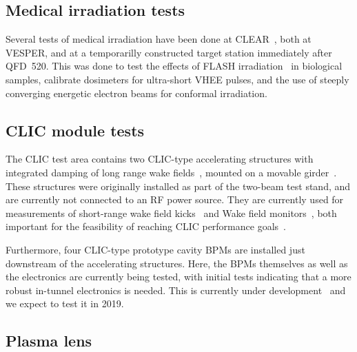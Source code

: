 \documentclass[a4paper,
               keeplastbox,   %
               ]{jacow}
\begin{document}
\subsection{Medical irradiation tests}
Several tests of medical irradiation have been done at CLEAR~\cite{Wilfrid::CLEARrev}, both at VESPER, and at a temporarilly constructed target station immediately after QFD~520.
This was done to test the effects of FLASH irradiation~\cite{FLASH2017} in biological samples, calibrate dosimeters for ultra-short VHEE pulses, and the use of steeply converging energetic electron beams for conformal irradiation.

\subsection{CLIC module tests}
The CLIC test area contains two CLIC-type accelerating structures with integrated damping of long range wake fields~\cite{Grudiev:TD26}, mounted on a movable girder~\cite{Durand-mover::AccelAlign12,Sosin-mover::IPAC12}.
These structures were originally installed as part of the two-beam test stand, and are currently not connected to an RF power source.
They are currently used for measurements of short-range wake field kicks~\cite{Antonio::IEEE-Kicks} and Wake field monitors~\cite{KyrreSjobak::CLICWS19}, both important for the feasibility of reaching CLIC performance goals~\cite{CLIC-CDR,CLIC-PIP}.


Furthermore, four CLIC-type prototype cavity BPMs are installed just downstream of the accelerating structures.
Here, the BPMs themselves as well as the electronics are currently being tested, with initial tests indicating that a more robust in-tunnel electronics is needed.
This is currently under development~\cite{AlexejLyapin::CLICWS19} and we expect to test it in 2019.

\subsection{Plasma lens}
\end{document}
